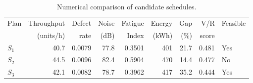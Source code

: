 \begin{table}[htbp]
\centering
\caption{Numerical comparison of candidate schedules.}
\label{tab:numerical-sim}
\small
\begin{tabular}{@{}lrrrrrrrl@{}}
\toprule
Plan & Throughput & Defect & Noise & Fatigue & Energy & Gap & V/R & Feasible \\
     & (units/h)  & rate   & (dB)  & Index   & (kWh)  & (\%) & score &         \\
\midrule
$S_{1}$ & 40.7 & 0.0079 & 77.8 & 0.3501 & 401 & 21.7 & 0.481 & Yes \\
$S_{2}$ & 44.5 & 0.0096 & 82.4 & 0.5904 & 470 & 14.4 & 0.477 & No \\
$S_{3}$ & 42.1 & 0.0082 & 78.7 & 0.3962 & 417 & 35.2 & 0.444 & Yes \\
\bottomrule
\end{tabular}
\end{table}

